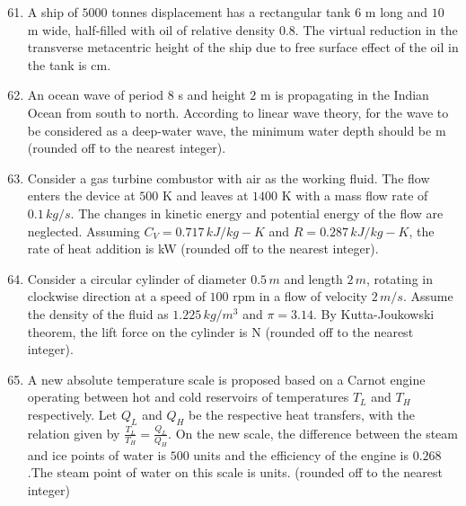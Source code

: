 \documentclass[journal]{IEEEtran}
\theoremstyle{remark}
\begin{document}
\begin{enumerate}[itemsep=1em]
\setcounter{enumi}{60}
\item A ship of $5000$ tonnes displacement has a rectangular tank $6$ m long and $10$ m wide, half-filled with oil of relative density $0.8$. The virtual reduction in the transverse 
metacentric height of the ship due to free surface effect of the oil in the tank is \underline{\hspace{2cm}} cm.  
\end{enumerate}

\newpage
\vspace*{0.25cm}

\begin{enumerate}[itemsep=1em]
\setcounter{enumi}{61}
\item An ocean wave of period $8$ s and height $2$ m is propagating in the Indian Ocean from south to north. According to linear wave theory, for the wave to be considered as a 
deep-water wave, the minimum water depth should be \underline{\hspace{1cm}} m (rounded off to the nearest integer). 
    
\end{enumerate}

\begin{enumerate}[itemsep=1em]
\setcounter{enumi}{62}
\item Consider a gas turbine combustor with air as the working fluid. The flow enters the device at $500$ K and leaves at $1400$ K with a mass flow rate of $0.1\,kg/s$. The changes 
in kinetic energy and potential energy of the flow are neglected. Assuming $C_V=0.717 \,kJ/kg-K$ and $R = 0.287\,kJ/kg-K$, the rate of heat addition is \underline{\hspace{1cm}} kW 
(rounded off to the nearest integer). 
\end{enumerate}

\begin{enumerate}[itemsep=1em]
\setcounter{enumi}{63}
\item Consider a circular cylinder of diameter $0.5 \,m$ and length $2\,m$, rotating in clockwise direction at a speed of $100$ rpm in a flow of velocity $2 \,m/s$. Assume the density of the fluid as $1.225\,kg/m^3$ and $\pi= 3.14$. By Kutta-Joukowski theorem, the lift force on the cylinder is \underline{\hspace{2cm}} N (rounded off to the nearest integer). 
\end{enumerate}

\begin{enumerate}[itemsep=1em]
\setcounter{enumi}{64}
\item A new absolute temperature scale is proposed based on a Carnot engine operating between hot and cold reservoirs of temperatures $T_L$ and $T_H$ respectively. Let $Q_L$ and  
$Q_H$ be the respective heat transfers, with the relation given by $\frac{T_L}{T_H}=\frac{Q_L}{Q_H}$. On the new scale, the difference between the steam and ice points of water is $500$ units and the efficiency of the engine is $0.268$.The steam point of water on this scale is \underline{\hspace{1cm}} units.
(rounded off to the nearest integer)
\end{enumerate}
\end{document}
